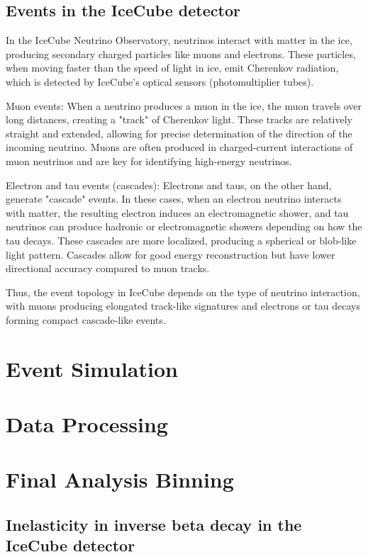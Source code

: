 \documentclass[a4paper,12pt,numbered]{article}
\begin{document}
\subsection{Events in the IceCube detector}

In the IceCube Neutrino Observatory, neutrinos interact with matter in the ice, producing secondary charged particles like muons and electrons. These particles, when moving faster than the speed of light in ice, emit Cherenkov radiation, which is detected by IceCube's optical sensors (photomultiplier tubes).

Muon events: When a neutrino produces a muon in the ice, the muon travels over long distances, creating a "track" of Cherenkov light. These tracks are relatively straight and extended, allowing for precise determination of the direction of the incoming neutrino. Muons are often produced in charged-current interactions of muon neutrinos and are key for identifying high-energy neutrinos.

Electron and tau events (cascades): Electrons and taus, on the other hand, generate "cascade" events. In these cases, when an electron neutrino interacts with matter, the resulting electron induces an electromagnetic shower, and tau neutrinos can produce hadronic or electromagnetic showers depending on how the tau decays. These cascades are more localized, producing a spherical or blob-like light pattern. Cascades allow for good energy reconstruction but have lower directional accuracy compared to muon tracks.

Thus, the event topology in IceCube depends on the type of neutrino interaction, with muons producing elongated track-like signatures and electrons or tau decays forming compact cascade-like events.

\section{Event Simulation}

\section{Data Processing}

\section{Final Analysis Binning}

\subsection{Inelasticity in inverse beta decay in the IceCube detector}
\end{document}
